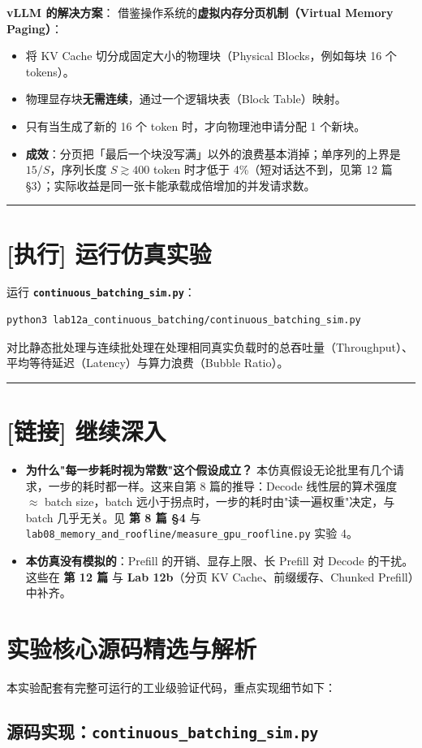 \textbf{vLLM 的解决方案}：
借鉴操作系统的\textbf{虚拟内存分页机制（Virtual Memory Paging）}：
\begin{itemize}
  \item 将 KV Cache 切分成固定大小的物理块（Physical Blocks，例如每块 16 个 tokens）。
  \item 物理显存块\textbf{无需连续}，通过一个逻辑块表（Block Table）映射。
  \item 只有当生成了新的 16 个 token 时，才向物理池申请分配 1 个新块。
  \item \textbf{成效}：分页把「最后一个块没写满」以外的浪费基本消掉；单序列的上界是 $15/S$，序列长度 $S \gtrsim 400$ token 时才低于 4\%（短对话达不到，见第 12 篇 §3）；实际收益是同一张卡能承载成倍增加的并发请求数。
\end{itemize}

\vspace{0.8em}\hrule\vspace{0.8em}

\section{[执行] 运行仿真实验}

运行 \textbf{\texttt{continuous\_batching\_sim.py}}：

\begin{lstlisting}[language=bash]
python3 lab12a_continuous_batching/continuous_batching_sim.py
\end{lstlisting}

对比静态批处理与连续批处理在处理相同真实负载时的总吞吐量（Throughput）、平均等待延迟（Latency）与算力浪费（Bubble Ratio）。

\vspace{0.8em}\hrule\vspace{0.8em}

\section{[链接] 继续深入}

\begin{itemize}
  \item \textbf{为什么"每一步耗时视为常数"这个假设成立？} 本仿真假设无论批里有几个请求，一步的耗时都一样。这来自第 8 篇的推导：Decode 线性层的算术强度 $\approx$ batch size，batch 远小于拐点时，一步的耗时由"读一遍权重"决定，与 batch 几乎无关。见 \textbf{第 8 篇 §4} 与 \texttt{lab08\_memory\_and\_roofline/measure\_gpu\_roofline.py} 实验 4。
  \item \textbf{本仿真没有模拟的}：Prefill 的开销、显存上限、长 Prefill 对 Decode 的干扰。这些在 \textbf{第 12 篇} 与 \textbf{Lab 12b}（分页 KV Cache、前缀缓存、Chunked Prefill）中补齐。
\end{itemize}



\section{实验核心源码精选与解析}

本实验配套有完整可运行的工业级验证代码，重点实现细节如下：


\subsection{源码实现：\texttt{continuous\_batching\_sim.py}}



